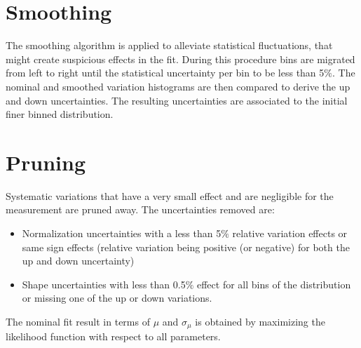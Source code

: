 

\section{Smoothing}
The smoothing algorithm is applied to alleviate statistical fluctuations, that might create suspicious effects in the fit.
During this procedure bins are migrated from left to right until the statistical uncertainty per bin to be less than 5$\%$. The nominal and smoothed variation histograms are then compared to derive the up and down uncertainties. The resulting uncertainties are associated to the initial finer binned distribution. 

\section{Pruning}
Systematic variations that have a very small effect and are negligible for the measurement are pruned away. The uncertainties removed are:
  \begin{itemize}
   \item  Normalization uncertainties with a less than 5$\%$ relative variation effects or same sign effects (relative variation being positive (or negative) for both the up and down uncertainty)
   \item  Shape uncertainties with less than 0.5$\%$ effect for all bins of the distribution or missing one of the up or down variations.
    \end{itemize}
    
The nominal fit result in terms of $\mu$ and $\sigma_{\mu}$ is obtained by maximizing the likelihood function with respect to all parameters.

